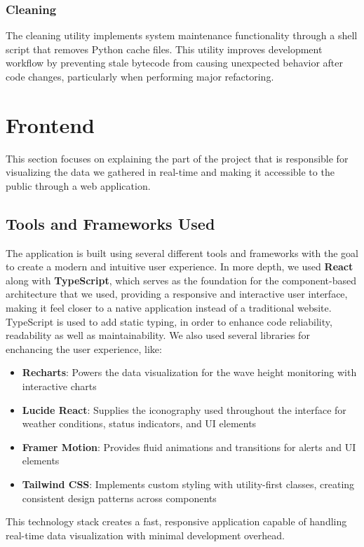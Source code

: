 \documentclass{article}
\begin{document}
    \subsubsection{Cleaning}
    The cleaning utility implements system maintenance functionality through a shell script that removes Python cache files. This utility improves development workflow by preventing stale bytecode from causing unexpected behavior after code changes, particularly when performing major refactoring.

\section{Frontend}
This section focuses on explaining the part of the project that is responsible for visualizing the data we gathered in real-time and making it accessible to the public through a web application.
\subsection{Tools and Frameworks Used}
    The application is built using several different tools and frameworks with the goal to create a modern and intuitive user experience. In more depth, we used \textbf{React} along with \textbf{TypeScript}, which serves as the foundation for the component-based architecture that we used, providing a responsive and interactive user interface, making it feel closer to a native application instead of a traditional website. TypeScript is used to add static typing, in order to enhance code reliability, readability as well as maintainability. We also used several libraries for enchancing the user experience, like:
    \begin{itemize}
        \item \textbf{Recharts}: Powers the data visualization for the wave height monitoring with interactive charts
        \item \textbf{Lucide React}: Supplies the iconography used throughout the interface for weather conditions, status indicators, and UI elements
        \item \textbf{Framer Motion}: Provides fluid animations and transitions for alerts and UI elements
        \item \textbf{Tailwind CSS}: Implements custom styling with utility-first classes, creating consistent design patterns across components
    \end{itemize}
    This technology stack creates a fast, responsive application capable of handling real-time data visualization with minimal development overhead.
        
\end{document}
